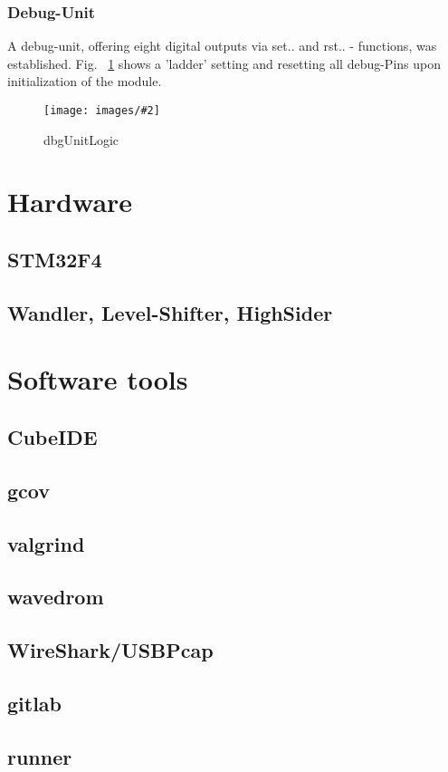 \documentclass[master,english,smartquotes,apa]{hgbthesis}
\newcommand \bildGr[5]{\begin{figure}[#1]	\centering	\texttt{[image: images/\#2]}	\caption{#3}	\label{#4}	\end{figure}}
\begin{document}
		\subsubsection{Debug-Unit}
		A debug-unit, offering eight digital outputs via set.. and rst.. - functions, was established. Fig. ~\ref{dbgUnitLogic} shows a 'ladder' setting and resetting all debug-Pins upon initialization of the module.
		
			\bildGr{b!}{dbgUnitLogic.png}{dbgUnitLogic}{dbgUnitLogic}{0.5\textwidth}

		
		
		\section{Hardware}
			\subsection{STM32F4}
			\subsection{Wandler, Level-Shifter, HighSider}

		\section{Software tools}
			\subsection{CubeIDE}
			\subsection{gcov}
			\subsection{valgrind}
			\subsection{wavedrom}
			\subsection{WireShark/USBPcap}
			\subsection{gitlab}
			\subsection{runner}
\end{document}
